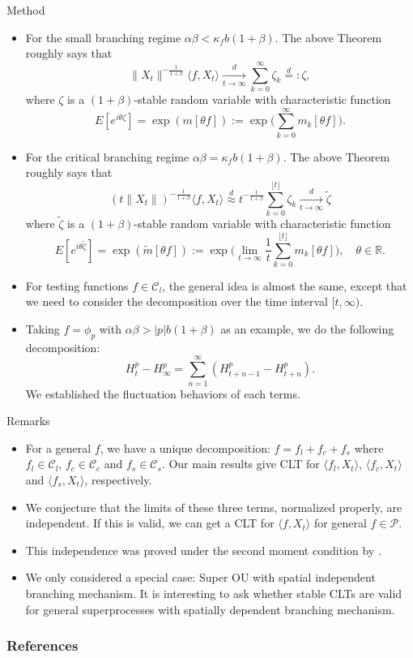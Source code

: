 \documentclass[9pt]{beamer}
\begin{document}
\begin{frame}[allowframebreaks]{Method}
\begin{itemize}
\item
	For the small branching regime $\alpha \beta < \kappa_f b(1+\beta)$. The above Theorem roughly says that
\[
	\|X_t\|^{-\frac{1}{1+\beta}}\langle f,X_t\rangle \xrightarrow[t\to \infty]{d} \sum_{k=0}^\infty \zeta_k \overset{d}{=}: \zeta,
\]
	where $\zeta$ is a $(1+\beta)$-stable random variable with characteristic function
\[
	E[e^{i\theta \zeta}] = \exp(m[\theta f]) := \exp\Big(\sum_{k=0}^\infty m_k[\theta f]\Big).
\]
\item
	For the critical branching regime $\alpha \beta = \kappa_f b(1+\beta)$. The above Theorem roughly says that
\[
	(t\|X_t\|)^{-\frac{1}{1+\beta}}\langle f,X_t\rangle \overset{d}{\approx} t^{-\frac{1}{1+\beta}} \sum_{k=0}^{\lfloor t\rfloor} \zeta_k \xrightarrow[t\to \infty]{d} \widetilde \zeta
\]
	where $\widetilde \zeta$ is a $(1+\beta)$-stable random variable with characteristic function
\[
	E[e^{i\theta \widetilde \zeta}] = \exp(\widetilde m[\theta f]) := \exp\Big(\lim_{t\to \infty} \frac{1}{t} \sum_{k=0}^{\lfloor t\rfloor} m_k[\theta f]\Big),\quad \theta \in \mathbb R.
\]
\item
	For  testing functions $f\in \mathcal C_l$, the general idea is almost the same, except that we need to consider the decomposition over the time interval $[t,\infty)$. 
\item
	Taking $f = \phi_p$ with $\alpha \beta > |p|b(1+\beta)$ as an example, we do the following decomposition:
\[
    H^p_t-H^p_\infty=\sum^{\infty}_{n=1}(H^p_{t+n-1}-H^p_{t+n}).
\]
    We established the fluctuation behaviors of each terms.
\end{itemize}
\end{frame}
\begin{frame}[allowframebreaks]{Remarks}
\begin{itemize}
\item
	For a general $f$, we have a unique decomposition: $f=f_l+f_c+f_s$ where $f_l \in \mathcal C_l$, $f_c \in \mathcal C_c$ and $f_s\in \mathcal C_s$.
	Our main results give CLT for $\langle f_l, X_t\rangle$, $\langle f_c, X_t\rangle$ and $\langle f_s, X_t\rangle$, respectively.
\item
	We conjecture that the limits of these three terms, normalized properly, are independent.
	If this is valid, we can get a CLT for $\langle f, X_t\rangle$ for general $f\in\mathcal{P}$.
\item
	This independence was proved under the second moment condition by \cite{RenSongZhang2015Central}.
\item
	We only considered a special case: Super OU with spatial independent branching mechanism. 
	It is interesting to ask whether stable CLTs are valid for general superprocesses with spatially dependent branching mechanism.
\end{itemize}
\end{frame}
\begin{frame}[allowframebreaks]
	\frametitle{References}
	\printbibliography
\end{frame}
\end{document}
